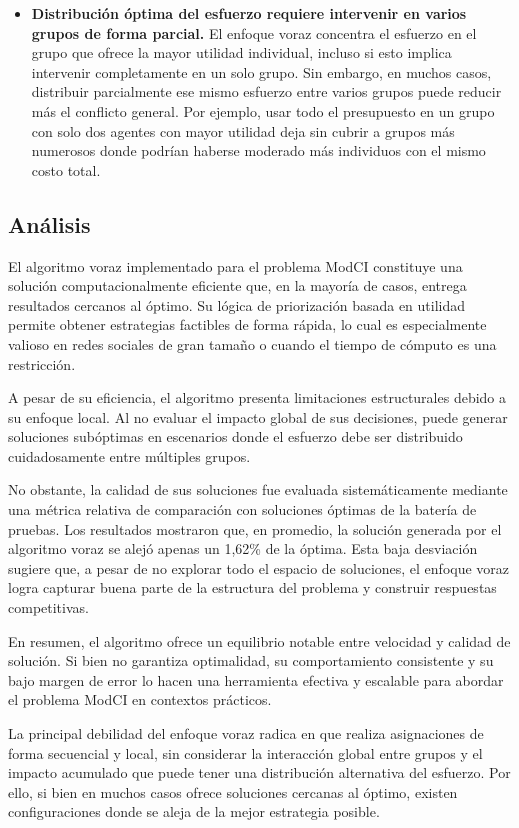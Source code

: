 \documentclass[11pt,letter]{article}
\begin{document}
    
    \begin{itemize}
    
    \item \textbf{Distribución óptima del esfuerzo requiere intervenir en varios grupos de forma parcial.}  
    El enfoque voraz concentra el esfuerzo en el grupo que ofrece la mayor utilidad individual, incluso si esto implica intervenir completamente en un solo grupo. Sin embargo, en muchos casos, distribuir parcialmente ese mismo esfuerzo entre varios grupos puede reducir más el conflicto general. Por ejemplo, usar todo el presupuesto en un grupo con solo dos agentes con mayor utilidad deja sin cubrir a grupos más numerosos donde podrían haberse moderado más individuos con el mismo costo total.
    
    \end{itemize}
    
        
    
    
    \subsection{Análisis}
    El algoritmo voraz implementado para el problema ModCI constituye una solución computacionalmente eficiente que, en la mayoría de casos, entrega resultados cercanos al óptimo. Su lógica de priorización basada en utilidad permite obtener estrategias factibles de forma rápida, lo cual es especialmente valioso en redes sociales de gran tamaño o cuando el tiempo de cómputo es una restricción.
    
    A pesar de su eficiencia, el algoritmo presenta limitaciones estructurales debido a su enfoque local. Al no evaluar el impacto global de sus decisiones, puede generar soluciones subóptimas en escenarios donde el esfuerzo debe ser distribuido cuidadosamente entre múltiples grupos.
    
    No obstante, la calidad de sus soluciones fue evaluada sistemáticamente mediante una métrica relativa de comparación con soluciones óptimas de la batería de pruebas. Los resultados mostraron que, en promedio, la solución generada por el algoritmo voraz se alejó apenas un 1{,}62\% de la óptima. Esta baja desviación sugiere que, a pesar de no explorar todo el espacio de soluciones, el enfoque voraz logra capturar buena parte de la estructura del problema y construir respuestas competitivas.
    
    En resumen, el algoritmo ofrece un equilibrio notable entre velocidad y calidad de solución. Si bien no garantiza optimalidad, su comportamiento consistente y su bajo margen de error lo hacen una herramienta efectiva y escalable para abordar el problema ModCI en contextos prácticos.
    \begin{tcolorbox}[colback=red!5!white, colframe=red!50!black, title=Advertencia sobre la correctitud]
            La principal debilidad del enfoque voraz radica en que realiza asignaciones de forma secuencial y local, sin considerar la interacción global entre grupos y el impacto acumulado que puede tener una distribución alternativa del esfuerzo. Por ello, si bien en muchos casos ofrece soluciones cercanas al óptimo, existen configuraciones donde se aleja de la mejor estrategia posible. 
        \end{tcolorbox}
\end{document}
